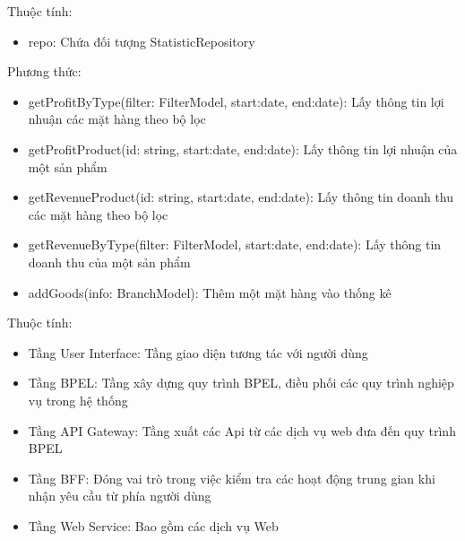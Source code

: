 Thuộc tính:
\begin{itemize}
	\item repo: Chứa đối tượng StatisticRepository
\end{itemize}
Phương thức:
\begin{itemize}
	\item getProfitByType(filter: FilterModel, start:date,
	      end:date): Lấy thông tin lợi nhuận các mặt hàng theo bộ lọc
	\item getProfitProduct(id: string, start:date,
	      end:date): Lấy thông tin lợi nhuận của một sản phẩm
	\item getRevenueProduct(id: string, start:date,
	      end:date): Lấy thông tin doanh thu các mặt hàng theo bộ lọc
	\item getRevenueByType(filter: FilterModel, start:date,
	      end:date): Lấy thông tin doanh thu của một sản phẩm
	\item addGoods(info: BranchModel): Thêm một mặt hàng vào thống kê
\end{itemize}

Thuộc tính:
\begin{itemize}
	\item Tầng User Interface: Tầng giao diện tương tác với người dùng
	\item Tầng BPEL: Tầng xây dựng quy trình BPEL, điều phối các quy trình nghiệp vụ trong hệ thống
	\item Tầng API Gateway: Tầng xuất các Api từ các dịch vụ web đưa đến quy trình BPEL
	\item Tầng BFF: Đóng vai trò trong việc kiểm tra các hoạt động trung gian khi nhận yêu cầu từ phía người dùng
	\item Tầng Web Service: Bao gồm các dịch vụ Web
\end{itemize}
\newpage



